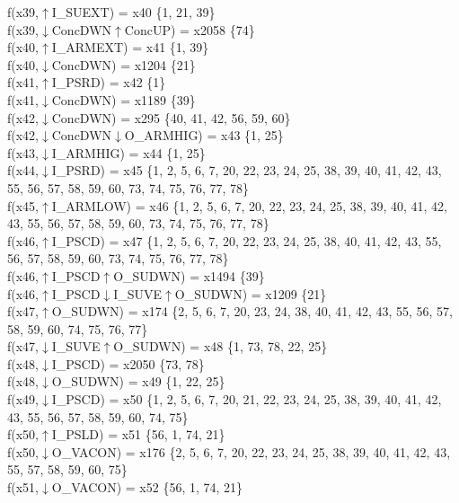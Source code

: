 f(x39,$\uparrow$I\_SUEXT) = x40 \{1, 21, 39\} \\  
f(x39,$\downarrow$ConcDWN$\uparrow$ConcUP) = x2058 \{74\} \\  
f(x40,$\uparrow$I\_ARMEXT) = x41 \{1, 39\} \\  
f(x40,$\downarrow$ConcDWN) = x1204 \{21\} \\  
f(x41,$\uparrow$I\_PSRD) = x42 \{1\} \\  
f(x41,$\downarrow$ConcDWN) = x1189 \{39\} \\  
f(x42,$\downarrow$ConcDWN) = x295 \{40, 41, 42, 56, 59, 60\} \\  
f(x42,$\downarrow$ConcDWN$\downarrow$O\_ARMHIG) = x43 \{1, 25\} \\  
f(x43,$\downarrow$I\_ARMHIG) = x44 \{1, 25\} \\  
f(x44,$\downarrow$I\_PSRD) = x45 \{1, 2, 5, 6, 7, 20, 22, 23, 24, 25, 38, 39, 40, 41, 42, 43, 55, 56, 57, 58, 59, 60, 73, 74, 75, 76, 77, 78\} \\  
f(x45,$\uparrow$I\_ARMLOW) = x46 \{1, 2, 5, 6, 7, 20, 22, 23, 24, 25, 38, 39, 40, 41, 42, 43, 55, 56, 57, 58, 59, 60, 73, 74, 75, 76, 77, 78\} \\  
f(x46,$\uparrow$I\_PSCD) = x47 \{1, 2, 5, 6, 7, 20, 22, 23, 24, 25, 38, 40, 41, 42, 43, 55, 56, 57, 58, 59, 60, 73, 74, 75, 76, 77, 78\} \\  
f(x46,$\uparrow$I\_PSCD$\uparrow$O\_SUDWN) = x1494 \{39\} \\  
f(x46,$\uparrow$I\_PSCD$\downarrow$I\_SUVE$\uparrow$O\_SUDWN) = x1209 \{21\} \\  
f(x47,$\uparrow$O\_SUDWN) = x174 \{2, 5, 6, 7, 20, 23, 24, 38, 40, 41, 42, 43, 55, 56, 57, 58, 59, 60, 74, 75, 76, 77\} \\  
f(x47,$\downarrow$I\_SUVE$\uparrow$O\_SUDWN) = x48 \{1, 73, 78, 22, 25\} \\  
f(x48,$\downarrow$I\_PSCD) = x2050 \{73, 78\} \\  
f(x48,$\downarrow$O\_SUDWN) = x49 \{1, 22, 25\} \\  
f(x49,$\downarrow$I\_PSCD) = x50 \{1, 2, 5, 6, 7, 20, 21, 22, 23, 24, 25, 38, 39, 40, 41, 42, 43, 55, 56, 57, 58, 59, 60, 74, 75\} \\  
f(x50,$\uparrow$I\_PSLD) = x51 \{56, 1, 74, 21\} \\  
f(x50,$\downarrow$O\_VACON) = x176 \{2, 5, 6, 7, 20, 22, 23, 24, 25, 38, 39, 40, 41, 42, 43, 55, 57, 58, 59, 60, 75\} \\  
f(x51,$\downarrow$O\_VACON) = x52 \{56, 1, 74, 21\} \\  
